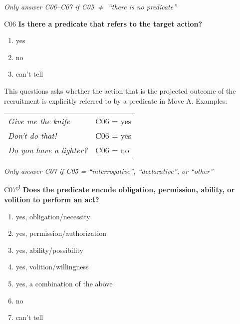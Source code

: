 \documentclass[output=paper]{langsci/langscibook}
\begin{document}
\begin{description}
\smallskip

\item
\textit{Only answer C06--C07 if C05 ${\neq}$ “there is no predicate”}

\item
C06   \textbf{Is there a predicate that refers to the target action?}

\begin{enumerate}
\item yes
\item no
\item can’t tell
\end{enumerate}

This questions asks whether the action that is the projected outcome of the recruitment is explicitly referred to by a predicate in Move A. Examples:

\begin{tabular}{l l}
\textit{Give me the knife} & C06 = yes \\
\textit{Don’t do that!}    & C06 = yes \\
\textit{Do you have a lighter?} &  C06 = no \\
\end{tabular}

\smallskip

\item
\textit{Only answer C07 if C05 = “interrogative”, “declarative”, or “other”}

\item
{C07\textsuperscript{gl} \textbf{Does the predicate encode obligation, permission, ability, or volition to perform an act?}}

\begin{enumerate}
\item
{yes, obligation/necessity}
\item
{yes, permission/authorization}
\item
{yes, ability/possibility}
\item
{yes, volition/willingness}
\item
{yes, a combination of the above}
\item
{no}
\item
{can’t tell}
\end{enumerate}


\end{description}
\end{document}
